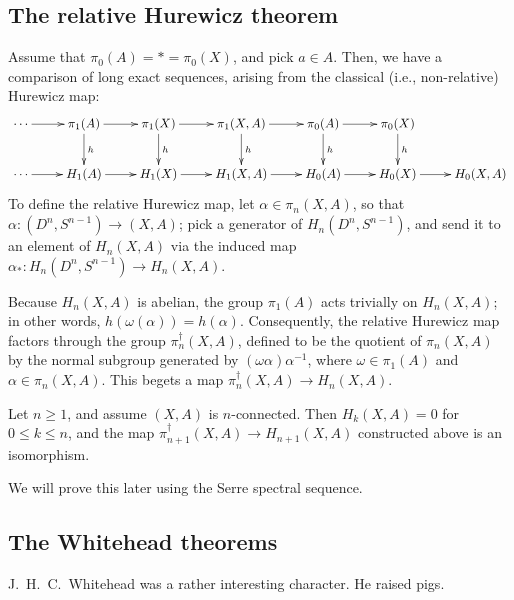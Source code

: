 \subsection{The relative Hurewicz theorem}
    Assume that $\pi_0(A) = \ast = \pi_0(X)$, and pick $a\in A$.
    Then, we have a comparison of long exact sequences, arising from the classical (i.e., non-relative) Hurewicz map:
    \begin{equation*}
	\xymatrix{
	    \cdots\ar[r] & \pi_1(A)\ar[r]\ar[d]^h & \pi_1(X)\ar[r]\ar[d]^h & \pi_1(X,A)\ar[r]\ar[d]^h & \pi_0(A)\ar[r]\ar[d]^h & \pi_0(X)\ar[d]^h & \\
	    \cdots\ar[r] & H_1(A)\ar[r] & H_1(X)\ar[r] & H_1(X,A)\ar[r] & H_0(A)\ar[r] & H_0(X)\ar[r] & H_0(X,A)
	    }
    \end{equation*}
To define the relative Hurewicz map, let $\alpha\in \pi_n(X,A)$, so that $\alpha:(D^n,S^{n-1})\to (X,A)$;
pick a generator of $H_n(D^n,S^{n-1})$, and send it to an element of $H_n(X,A)$ via the induced map
$\alpha_\ast:H_n(D^n,S^{n-1})\to H_n(X,A)$.

Because $H_n(X,A)$ is abelian, the group $\pi_1(A)$ acts trivially on $H_n(X,A)$; in other words,
$h(\omega(\alpha)) = h(\alpha)$.
Consequently, the relative Hurewicz map factors through the group $\pi_n^\dagger(X,A)$, defined to be
the quotient of $\pi_n(X,A)$ by the normal subgroup generated by $(\omega\alpha)\alpha^{-1}$,
where $\omega\in\pi_1(A)$ and $\alpha\in \pi_n(X,A)$.
This begets a map $\pi_n^\dagger(X,A)\to H_n(X,A)$.
\begin{theorem}
    Let $n\geq 1$, and assume $(X,A)$ is $n$-connected.
    Then $H_k(X,A) = 0$ for $0\leq k\leq n$, and the map $\pi_{n+1}^\dagger(X,A)\to H_{n+1}(X,A)$ constructed above
    is an isomorphism.
\end{theorem}
We will prove this later using the Serre spectral sequence.
\subsection{The Whitehead theorems}
J.~H.~C.~Whitehead was a rather interesting character. He raised pigs.

